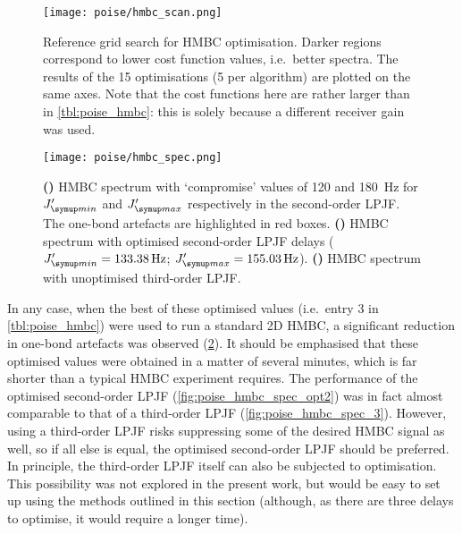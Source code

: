 \begin{figure}[htb]
    \centering
    \texttt{[image: poise/hmbc\_scan.png]}%
    \caption[Reference grid search for HMBC optimisation]{
        Reference grid search for HMBC optimisation.
        Darker regions correspond to lower cost function values, i.e.\ better spectra.
        The results of the 15 optimisations (5 per algorithm) are plotted on the same axes.
        Note that the cost functions here are rather larger than in \cref{tbl:poise_hmbc}: this is solely because a different receiver gain was used.
    }
    \label{fig:poise_hmbc_scan}
\end{figure}

\begin{figure}[!htb]
    \centering
    \texttt{[image: poise/hmbc\_spec.png]}%
    {\label{fig:poise_hmbc_spec_unopt2}}%
    {\label{fig:poise_hmbc_spec_opt2}}%
    {\label{fig:poise_hmbc_spec_3}}%
    \caption[HMBC spectra before and after optimisation]{
        \textbf{()} HMBC spectrum with `compromise' values of 120 and \qty{180}{\Hz} for $\Jmin'$ and $\Jmax'$ respectively in the second-order LPJF.
        The one-bond artefacts are highlighted in red boxes.
        \textbf{()} HMBC spectrum with optimised second-order LPJF delays ($\Jmin' = \qty{133.38}{\Hz}$; $\Jmax' = \qty{155.03}{\Hz}$).
        \textbf{()} HMBC spectrum with unoptimised third-order LPJF.
    }
    \label{fig:poise_hmbc_spec}
\end{figure}

In any case, when the best of these optimised values (i.e.\ entry 3 in \cref{tbl:poise_hmbc}) were used to run a standard 2D HMBC, a significant reduction in one-bond artefacts was observed (\cref{fig:poise_hmbc_spec}).
It should be emphasised that these optimised values were obtained in a matter of several minutes, which is far shorter than a typical HMBC experiment requires.
The performance of the optimised second-order LPJF (\cref{fig:poise_hmbc_spec_opt2}) was in fact almost comparable to that of a third-order LPJF (\cref{fig:poise_hmbc_spec_3}).
However, using a third-order LPJF risks suppressing some of the desired HMBC signal as well, so if all else is equal, the optimised second-order LPJF should be preferred.
In principle, the third-order LPJF itself can also be subjected to optimisation.
This possibility was not explored in the present work, but would be easy to set up using the methods outlined in this section (although, as there are three delays to optimise, it would require a longer time).

